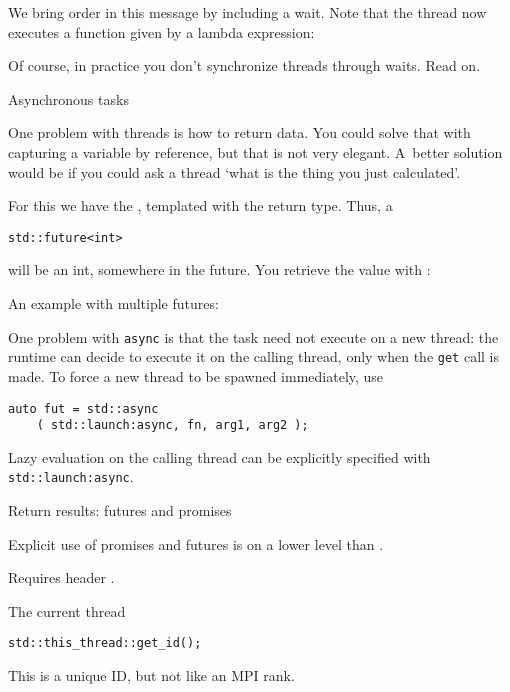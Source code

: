 We bring order in this message by including a wait.
Note that the thread now executes a function
given by a lambda expression:
%

Of course, in practice you don't synchronize threads through waits.
Read on.

 {Asynchronous tasks}

One problem with threads is how to return data.
You could solve that with capturing a variable by reference,
but that is not very elegant.
A~better solution would be if you could ask a thread
`what is the thing you just calculated'.

For this we have the ,
templated with the return type. Thus, a
\begin{lstlisting}
std::future<int>
\end{lstlisting}
will be an int, somewhere in the future.
You retrieve the value with :


An example with multiple futures:


One problem with \lstinline{async} is that the task need not execute on a new thread:
the runtime can decide to execute it on the calling thread,
only when the \lstinline{get} call is made.
To force a new thread to be spawned immediately, use
\begin{lstlisting}
auto fut = std::async
    ( std::launch:async, fn, arg1, arg2 );
\end{lstlisting}
Lazy evaluation on the calling thread can be explicitly
specified with \lstinline+std::launch:async+.

 {Return results: futures and promises}

Explicit use of promises and futures is on a lower level than .

Requires header .


\begin{multicols}{2}
\end{multicols}

 {The current thread}
\label{sec:this-thread}

\begin{lstlisting}
std::this_thread::get_id();
\end{lstlisting}
This is a unique ID, but not like an MPI rank.

